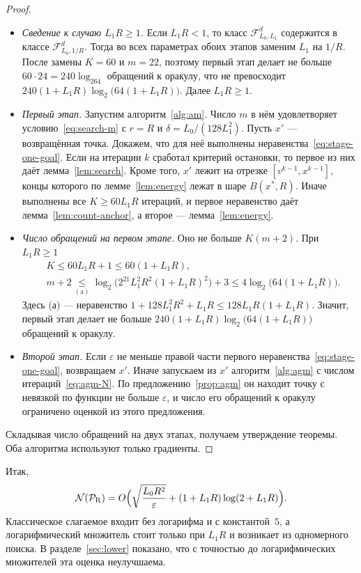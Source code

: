 \documentclass[11pt,a4paper]{article}
\newcommand{\F}{\mathcal F}
\newcommand{\by}[2]{\mathrel{\underset{#2}{#1}}}
\begin{document}
\begin{proof}
\leavevmode
\begin{itemize}
\item \emph{Сведение к случаю $L_1R\ge1$.} Если $L_1R<1$, то класс $\F_{L_0,L_1}^d$ содержится в классе $\F_{L_0,1/R}^d$. Тогда во всех параметрах обоих этапов заменим $L_1$ на $1/R$. После замены $K=60$ и $m=22$, поэтому первый этап делает не больше $60\cdot24=240\log_264$ обращений к оракулу, что не превосходит $240(1+L_1R)\log_2\bigl(64(1+L_1R)\bigr)$. Далее $L_1R\ge1$.
\item \emph{Первый этап.} Запустим алгоритм~\ref{alg:am}. Число $m$ в нём удовлетворяет условию~\eqref{eq:search-m} с $r=R$ и $\delta=L_0/(128L_1^2)$. Пусть $x'$ --- возвращённая точка. Докажем, что для неё выполнены неравенства~\eqref{eq:stage-one-goal}. Если на итерации $k$ сработал критерий остановки, то первое из них даёт лемма~\ref{lem:search}. Кроме того, $x'$ лежит на отрезке $[v^{k-1},x^{k-1}]$, концы которого по лемме~\ref{lem:energy} лежат в шаре $B(x^\ast,R)$. Иначе выполнены все $K\ge60L_1R$ итераций, и первое неравенство даёт лемма~\ref{lem:count-anchor}, а второе --- лемма~\ref{lem:energy}.
\item \emph{Число обращений на первом этапе.} Оно не больше $K(m+2)$. При $L_1R\ge1$
\begin{align*}
 &K\le60L_1R+1\le60(1+L_1R),\\
 &m+2\by{\le}{(\mathrm a)}\log_2\bigl(2^{21}L_1^2R^2(1+L_1R)^2\bigr)+3\le4\log_2\bigl(64(1+L_1R)\bigr) .
\end{align*}
Здесь (а) --- неравенство $1+128L_1^2R^2+L_1R\le128L_1R(1+L_1R)$. Значит, первый этап делает не больше $240(1+L_1R)\log_2\bigl(64(1+L_1R)\bigr)$ обращений к оракулу.
\item \emph{Второй этап.} Если $\varepsilon$ не меньше правой части первого неравенства~\eqref{eq:stage-one-goal}, возвращаем $x'$. Иначе запускаем из $x'$ алгоритм~\ref{alg:agm} с числом итераций~\eqref{eq:agm-N}. По предложению~\ref{prop:agm} он находит точку с невязкой по функции не больше $\varepsilon$, и число его обращений к оракулу ограничено оценкой из этого предложения.
\end{itemize}
Складывая число обращений на двух этапах, получаем утверждение теоремы. Оба алгоритма используют только градиенты.
\end{proof}

Итак,
\[
 \mathcal N(\mathcal P_{\rm R})=O\Bigl(\sqrt{\frac{L_0R^2}\varepsilon}+(1+L_1R)\log(2+L_1R)\Bigr).
\]
Классическое слагаемое входит без логарифма и с константой~$5$, а логарифмический множитель стоит только при $L_1R$ и возникает из одномерного поиска. В разделе~\ref{sec:lower} показано, что с точностью до логарифмических множителей эта оценка неулучшаема.
\end{document}
